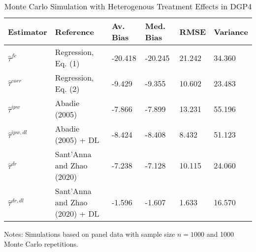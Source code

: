 \begin{table}[]
\centering
\begin{threeparttable}
\caption{Monte Carlo Simulation with Heterogenous Treatment Effects in DGP4}
\label{tab:table3}
\begin{tabular}{llllll}
\toprule
Estimator         & Reference                         & Av. Bias   & Med. Bias   & RMSE & Variance  \\ \midrule
\addlinespace
$\hat{\tau}^{fe}$ & Regression, Eq. (1)               & -20.418      & -20.245        & 21.242 & 34.360      \\
$\hat{\tau}^{corr}$ & Regression, Eq. (2)             & -9.429      & -9.355       & 10.602 & 23.483      \\
$\hat{\tau}^{ipw}$ & Abadie (2005)                    & -7.866       & -7.899       & 13.231 & 55.196      \\
$\hat{\tau}^{ipw,dl}$ & Abadie (2005) + DL            & -8.424       & -8.408        & 8.432 & 51.123      \\
$\hat{\tau}^{dr}$ & Sant'Anna and Zhao (2020)         & -7.238      & -7.128        & 10.115 & 24.060      \\
$\hat{\tau}^{dr,dl}$ & Sant'Anna and Zhao (2020) + DL & -1.596       & -1.607        & 1.633 & 16.570      \\

\bottomrule
\end{tabular}
\begin{tablenotes}
    \item Notes: Simulations based on panel data with sample size $n = 1000$ and 1000 Monte Carlo repetitions.
\end{tablenotes}
\end{threeparttable}
\end{table}
